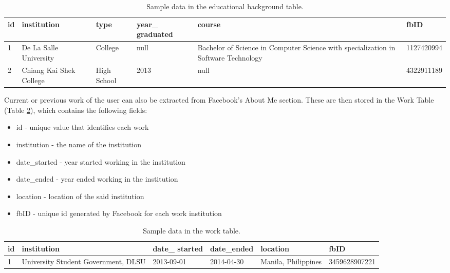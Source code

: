 \begin{table}[ph!]   %
\centering
\caption{Sample data in the educational background table.} \vspace{0.25em}
\begin{tabular}{|p{.5cm}|p{1in}|p{1.5cm}|p{2cm}|p{2.5cm}|p{2cm}|} \hline
\textbf{id} & \textbf{institution} & \textbf{type} & \textbf{year\_ \newline graduated} & \textbf{course} & \textbf{fbID} \\ \hline
1 & De La Salle University & College & null & Bachelor of Science in Computer Science with specialization in Software Technology & 1127420994 \\ \hline
2 & Chiang Kai Shek College & High School & 2013 & null & 4322911189\\ \hline
\end{tabular}
\label{tab:EducationalBG}
\end{table}

Current or previous work of the user can also be extracted from Facebook’s About Me section. These are then stored in the Work Table (Table \ref{tab:work}), which contains the following fields:
\begin{itemize}
\item id - unique value that identifies each work
\item institution - the name of the institution
\item date\_started - year started working in the institution
\item date\_ended - year ended working in the institution
\item location - location of the said institution
\item fbID - unique id generated by Facebook for each work institution
\end{itemize}

\begin{table}[ph!]  
\centering
\caption{Sample data in the work table.} \vspace{0.25em}
\begin{tabular}{|p{.5cm}|p{1.5in}|p{2cm}|p{2cm}|p{2cm}|p{2.5cm}|} \hline
\textbf{id} & \textbf{institution} & \textbf{date\_ \newline started} & \textbf{date\_\newline ended} & \textbf{location} & \textbf{fbID} \\ \hline
1 & University Student Government, DLSU & 2013-09-01 & 2014-04-30 & Manila, Philippines &  
3459628907221
\\ \hline
\end{tabular}
\label{tab:work}
\end{table}


